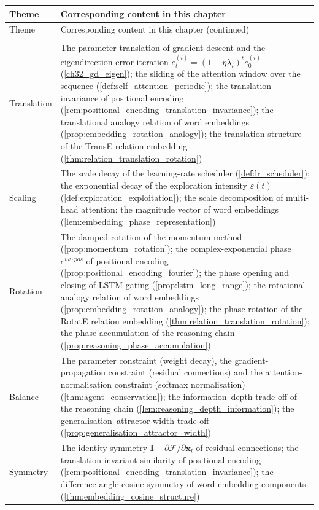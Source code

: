\begingroup
\begin{longtable}{>{\centering\arraybackslash}p{2.8cm}>{\raggedright\arraybackslash}p{9.9cm}}
\toprule
Theme & Corresponding content in this chapter \\
\midrule
\endfirsthead
\toprule
Theme & Corresponding content in this chapter (continued) \\
\midrule
\endhead
\midrule
\multicolumn{2}{r}{Continued on next page}\\
\endfoot
\bottomrule
\endlastfoot
Translation & The parameter translation of gradient descent and the eigendirection error iteration $e_t^{(i)} = (1-\eta\lambda_i)^t e_0^{(i)}$ (\cref{ch32_gd_eigen}); the sliding of the attention window over the sequence (\cref{def:self_attention_periodic}); the translation invariance of positional encoding (\cref{rem:positional_encoding_translation_invariance}); the translational analogy relation of word embeddings (\cref{prop:embedding_rotation_analogy}); the translation structure of the TransE relation embedding (\cref{thm:relation_translation_rotation}) \\
Scaling & The scale decay of the learning-rate scheduler (\cref{def:lr_scheduler}); the exponential decay of the exploration intensity $\varepsilon(t)$ (\cref{def:exploration_exploitation}); the scale decomposition of multi-head attention; the magnitude vector of word embeddings (\cref{lem:embedding_phase_representation}) \\
Rotation & The damped rotation of the momentum method (\cref{prop:momentum_rotation}); the complex-exponential phase $e^{i\omega\cdot pos}$ of positional encoding (\cref{prop:positional_encoding_fourier}); the phase opening and closing of LSTM gating (\cref{prop:lstm_long_range}); the rotational analogy relation of word embeddings (\cref{prop:embedding_rotation_analogy}); the phase rotation of the RotatE relation embedding (\cref{thm:relation_translation_rotation}); the phase accumulation of the reasoning chain (\cref{prop:reasoning_phase_accumulation}) \\
Balance & The parameter constraint (weight decay), the gradient-propagation constraint (residual connections) and the attention-normalisation constraint (softmax normalisation) (\cref{thm:agent_conservation}); the information--depth trade-off of the reasoning chain (\cref{lem:reasoning_depth_information}); the generalisation--attractor-width trade-off (\cref{prop:generalisation_attractor_width}) \\
Symmetry & The identity symmetry $\mathbf{I} + \partial\mathcal{F}/\partial\mathbf{x}_l$ of residual connections; the translation-invariant similarity of positional encoding (\cref{rem:positional_encoding_translation_invariance}); the difference-angle cosine symmetry of word-embedding components (\cref{thm:embedding_cosine_structure}) \\

\end{longtable}
